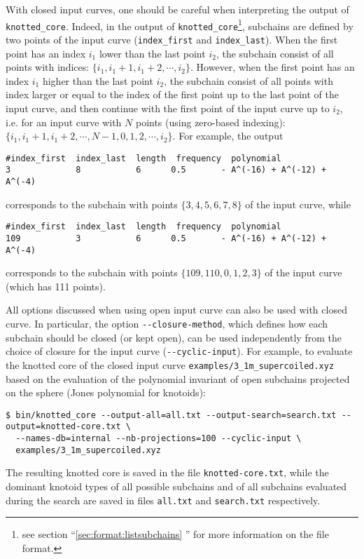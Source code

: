 With closed input curves, one should be careful when interpreting the output of \lstinline{knotted_core}. Indeed, in the output of \lstinline{knotted_core}\footnote{see section ``\ref{sec:format:listsubchains} '' for more information on the file format.}, subchains are defined by two points of the input curve (\lstinline{index_first} and \lstinline{index_last}). When the first point has an index $i_1$ lower than the last point $i_2$, the subchain consist of all points with indices: $\{i_1,i_1+1,i_1+2,\cdots,i_2\}$.
However, when the first point has an index $i_1$ higher than the last point $i_2$, the subchain consist of all points with index larger or equal to the index of the first point up to the last point of the input curve, and then continue with the first point of the input curve up to $i_2$, i.e. for an input curve with $N$ points (using zero-based indexing): $\{i_1,i_1+1,i_1+2,\cdots,N-1,0,1,2,\cdots,i_2\}$. For example, the output
\begin{lstlisting}
#index_first  index_last  length  frequency  polynomial
3             8           6      0.5       - A^(-16) + A^(-12) + A^(-4)
\end{lstlisting}
corresponds to the subchain with points $\{3,4,5,6,7,8\}$ of the input curve, while 
\begin{lstlisting}
#index_first  index_last  length  frequency  polynomial
109           3           6      0.5       - A^(-16) + A^(-12) + A^(-4)
\end{lstlisting}
corresponds to the subchain with points $\{109,110,0,1,2,3\}$ of the input curve (which has 111 points).

All options discussed when using open input curve can also be used with closed curve. In particular, the option \lstinline{--closure-method}, which defines how each subchain should be closed (or kept open), can be used independently from the choice of closure for the input curve (\lstinline{--cyclic-input}). For example, to evaluate the knotted core of the closed input curve \lstinline{examples/3_1m_supercoiled.xyz} based on the evaluation of the polynomial invariant of open subchains projected on the sphere (Jones polynomial for knotoids):
\begin{lstlisting}
$ bin/knotted_core --output-all=all.txt --output-search=search.txt --output=knotted-core.txt \
  --names-db=internal --nb-projections=100 --cyclic-input \
  examples/3_1m_supercoiled.xyz
\end{lstlisting}
The resulting knotted core is saved in the file \lstinline{knotted-core.txt}, while the dominant knotoid types of all possible subchains and of all subchains evaluated during the search are saved in files \lstinline{all.txt} and \lstinline{search.txt} respectively.



